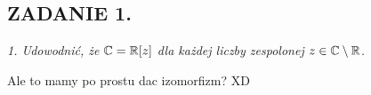 \documentclass{article}
\begin{document}
\subsection*{ZADANIE 1.}
\emph{1. Udowodnić, że $\mathbb{C}=\mathbb{R}[z]$ dla każdej liczby zespolonej $z\in\mathbb{C}\setminus\mathbb{R}$.}
\smallskip

Ale to mamy po prostu dac izomorfizm? XD
\end{document}
